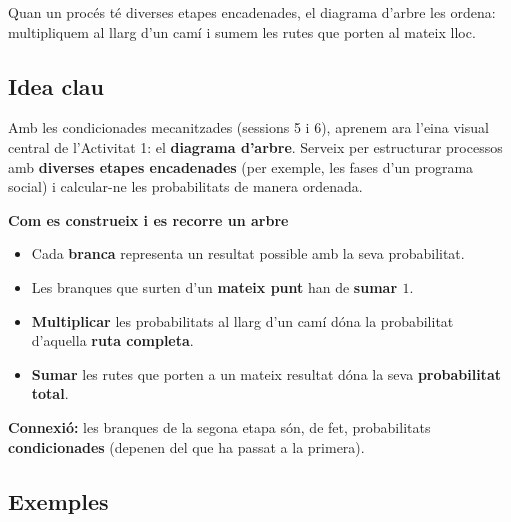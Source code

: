 %
{Quan un procés té diverses etapes encadenades, el diagrama d'arbre les ordena: multipliquem al llarg d'un camí i sumem les rutes que porten al mateix lloc.}

\subsection{Idea clau}

Amb les condicionades mecanitzades (sessions 5 i 6), aprenem ara l'eina visual central
de l'Activitat 1: el \textbf{diagrama d'arbre}. Serveix per estructurar processos amb
\textbf{diverses etapes encadenades} (per exemple, les fases d'un programa social) i
calcular-ne les probabilitats de manera ordenada.

\begin{idea}
\textbf{Com es construeix i es recorre un arbre}
\begin{itemize}[leftmargin=1.4em, itemsep=2pt]
  \item Cada \textbf{branca} representa un resultat possible amb la seva probabilitat.
  \item Les branques que surten d'un \textbf{mateix punt} han de \textbf{sumar $1$}.
  \item \textbf{Multiplicar} les probabilitats al llarg d'un camí dóna la probabilitat
        d'aquella \textbf{ruta completa}.
  \item \textbf{Sumar} les rutes que porten a un mateix resultat dóna la seva
        \textbf{probabilitat total}.
\end{itemize}
\textbf{Connexió:} les branques de la segona etapa són, de fet, probabilitats
\textbf{condicionades} (depenen del que ha passat a la primera).
\end{idea}

\subsection{Exemples}

